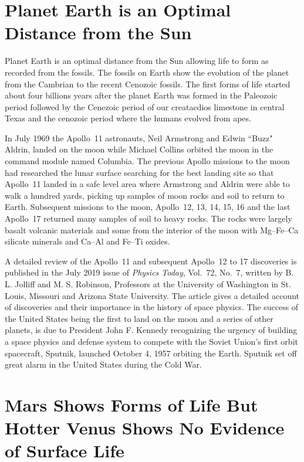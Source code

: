 \documentclass[a4paper,openany,12pt]{book}
\begin{document}
\section{Planet Earth is an Optimal Distance from the Sun}

Planet Earth is an optimal distance from the Sun allowing life to form as recorded from the fossils. The fossils on Earth show the evolution of the planet from the Cambrian to the recent Cenozoic fossils. The first forms of life started about four billions years after the planet Earth was formed in the Paleozoic period followed by the Cenezoic period of our creatacdios limestone in central Texas and the cenozoic period where the humans evolved  from apes.

In July 1969 the Apollo~11 astronauts, Neil Armstrong and Edwin ``Buzz" Aldrin, landed on the moon while Michael Collins orbited the moon in the command module named Columbia. The previous Apollo missions to the moon had researched the lunar surface searching for the best landing site so that Apollo~11 landed in a safe level area where Armstrong and Aldrin were able to walk a hundred yards, picking up samples of moon rocks and soil to return to Earth. Subsequent missions to the moon, Apollo~12, 13, 14, 15, 16 and the last Apollo~17 returned many samples of soil to heavy rocks. The rocks were largely basalt volcanic materials and some from the interior of the moon with Mg--Fe--Ca silicate minerals and Ca--Al and Fe--Ti oxides.

A detailed review of the Apollo~11 and subsequent Apollo~12 to 17 discoveries is published in the July 2019 issue of \emph{Physics Today}, Vol.~72, No.~7, written by B. L. Jolliff and M. S. Robinson, Professors at the University of Washington in St. Louis, Missouri and Arizona State University. The article gives a detailed account of discoveries and their importance in the history of space physics. The success of the United States being the first to land on the moon and a series of other planets, is due to President John F. Kennedy recognizing the urgency of building a space physics and defense system to compete with the Soviet Union's first orbit spacecraft, Sputnik, launched October 4, 1957 orbiting the Earth. Sputnik set off great alarm in the United States during the Cold War.

\section{Mars Shows Forms of Life But Hotter Venus Shows No Evidence of Surface Life}
\end{document}
